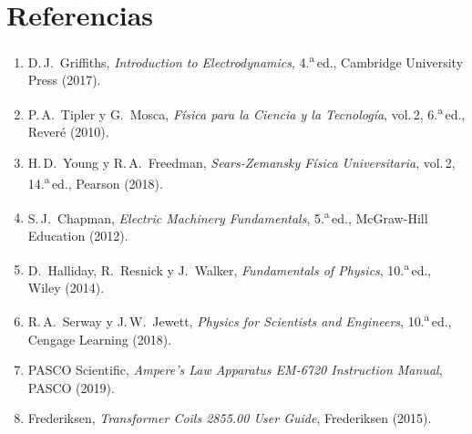 \documentclass[11pt,twocolumn]{article}
\begin{document}
\section*{Referencias}

\begin{enumerate}\setlength\itemsep{2pt}
  \item D.\,J.~Griffiths, \textit{Introduction to Electrodynamics}, 4.\textsuperscript{a}\,ed., Cambridge University Press (2017).
  \item P.\,A.~Tipler y G.~Mosca, \textit{F\'isica para la Ciencia y la Tecnolog\'ia}, vol.\,2, 6.\textsuperscript{a}\,ed., Rever\'e (2010).
  \item H.\,D.~Young y R.\,A.~Freedman, \textit{Sears-Zemansky F\'isica Universitaria}, vol.\,2, 14.\textsuperscript{a}\,ed., Pearson (2018).
  \item S.\,J.~Chapman, \textit{Electric Machinery Fundamentals}, 5.\textsuperscript{a}\,ed., McGraw-Hill Education (2012).
  \item D.~Halliday, R.~Resnick y J.~Walker, \textit{Fundamentals of Physics}, 10.\textsuperscript{a}\,ed., Wiley (2014).
  \item R.\,A.~Serway y J.\,W.~Jewett, \textit{Physics for Scientists and Engineers}, 10.\textsuperscript{a}\,ed., Cengage Learning (2018).
  \item PASCO Scientific, \textit{Ampere's Law Apparatus EM-6720 Instruction Manual}, PASCO (2019).
  \item Frederiksen, \textit{Transformer Coils 2855.00 User Guide}, Frederiksen (2015).
\end{enumerate}
\end{document}
